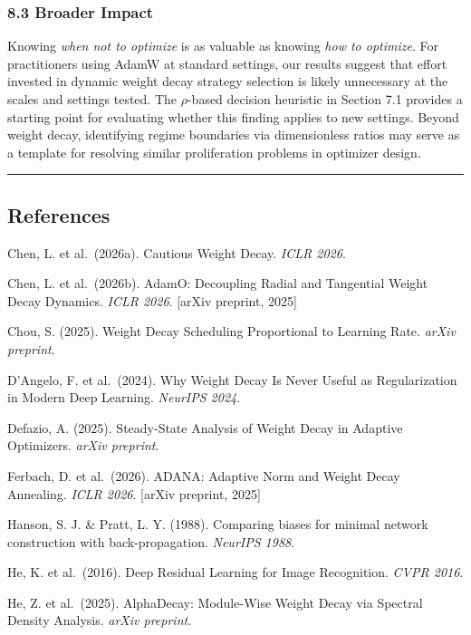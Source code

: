 \documentclass[
]{article}
\begin{document}
\hypertarget{broader-impact}{%
\subsubsection{8.3 Broader Impact}\label{broader-impact}}

Knowing \emph{when not to optimize} is as valuable as knowing \emph{how
to optimize}. For practitioners using AdamW at standard settings, our
results suggest that effort invested in dynamic weight decay strategy
selection is likely unnecessary at the scales and settings tested. The
\(\rho\)-based decision heuristic in Section 7.1 provides a starting
point for evaluating whether this finding applies to new settings.
Beyond weight decay, identifying regime boundaries via dimensionless
ratios may serve as a template for resolving similar proliferation
problems in optimizer design.

\begin{center}\rule{0.5\linewidth}{0.5pt}\end{center}

\hypertarget{references}{%
\subsection{References}\label{references}}

Chen, L. et al.~(2026a). Cautious Weight Decay. \emph{ICLR 2026}.

Chen, L. et al.~(2026b). AdamO: Decoupling Radial and Tangential Weight
Decay Dynamics. \emph{ICLR 2026}. {[}arXiv preprint, 2025{]}

Chou, S. (2025). Weight Decay Scheduling Proportional to Learning Rate.
\emph{arXiv preprint}.

D'Angelo, F. et al.~(2024). Why Weight Decay Is Never Useful as
Regularization in Modern Deep Learning. \emph{NeurIPS 2024}.

Defazio, A. (2025). Steady-State Analysis of Weight Decay in Adaptive
Optimizers. \emph{arXiv preprint}.

Ferbach, D. et al.~(2026). ADANA: Adaptive Norm and Weight Decay
Annealing. \emph{ICLR 2026}. {[}arXiv preprint, 2025{]}

Hanson, S. J. \& Pratt, L. Y. (1988). Comparing biases for minimal
network construction with back-propagation. \emph{NeurIPS 1988}.

He, K. et al.~(2016). Deep Residual Learning for Image Recognition.
\emph{CVPR 2016}.

He, Z. et al.~(2025). AlphaDecay: Module-Wise Weight Decay via Spectral
Density Analysis. \emph{arXiv preprint}.
\end{document}
